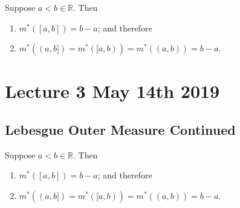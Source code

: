 \documentclass[notoc,notitlepage]{tufte-book}
\begin{document}
\begin{propononum}
  Suppose $a < b \in \mathbb{R}$. Then
  \begin{enumerate}
    \item $m^*([a, b]) = b - a$; and therefore
    \item $m^*((a, b]) = m^*([a, b)) = m^*((a, b)) = b - a$.
  \end{enumerate}
\end{propononum}



\chapter{Lecture 3 May 14th 2019}%
\label{chp:lecture_3_may_14th_2019}

\section{Lebesgue Outer Measure Continued}%
\label{sec:lebesgue_outer_measure_continued}

\begin{propo}\label{propo:lom_of_arbitrary_intervals}
  Suppose $a < b \in \mathbb{R}$. Then
  \begin{enumerate}
    \item $m^*([a, b]) = b - a$; and therefore
    \item $m^*((a, b]) = m^*([a, b)) = m^*((a, b)) = b - a$.
  \end{enumerate}
\end{propo}
\end{document}
